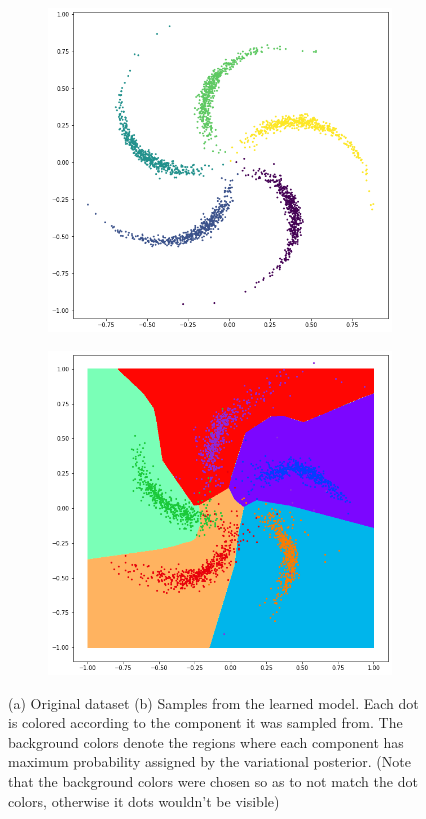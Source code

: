 \begin{figure}
\centering
  \begin{subfigure}[t]{.5\textwidth}
    \raggedleft
    \includegraphics[width=0.6\linewidth]{figures/original_pinwheel.png}
  \end{subfigure}%
  \begin{subfigure}[t]{.5\textwidth}
    \raggedright
    \includegraphics[width=0.6\linewidth]{figures/trained_pinwheel.png}
  \end{subfigure}
  \caption{\scriptsize (a) Original dataset (b) Samples from the learned model. Each
dot is colored according to the component it was sampled from. The background
colors denote the regions where each component has maximum probability assigned
by the variational posterior. (Note that the background colors were chosen
so as to not match the dot colors, otherwise it dots wouldn't be visible)}
  \label{fig:pinwheel}
\end{figure}

